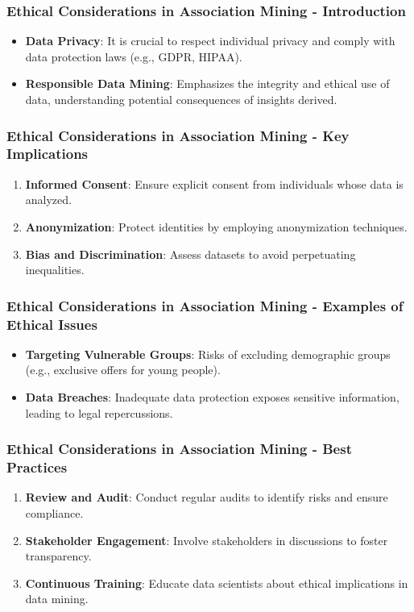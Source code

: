 \documentclass[aspectratio=169]{beamer}
\begin{document}
\begin{frame}[fragile]
    \frametitle{Ethical Considerations in Association Mining - Introduction}
    \begin{itemize}
        \item \textbf{Data Privacy}: 
        It is crucial to respect individual privacy and comply with data protection laws (e.g., GDPR, HIPAA).
        \item \textbf{Responsible Data Mining}: 
        Emphasizes the integrity and ethical use of data, understanding potential consequences of insights derived.
    \end{itemize}
\end{frame}

\begin{frame}[fragile]
    \frametitle{Ethical Considerations in Association Mining - Key Implications}
    \begin{enumerate}
        \item \textbf{Informed Consent}: 
        Ensure explicit consent from individuals whose data is analyzed.
        \item \textbf{Anonymization}: 
        Protect identities by employing anonymization techniques.
        \item \textbf{Bias and Discrimination}: 
        Assess datasets to avoid perpetuating inequalities.
    \end{enumerate}
\end{frame}

\begin{frame}[fragile]
    \frametitle{Ethical Considerations in Association Mining - Examples of Ethical Issues}
    \begin{itemize}
        \item \textbf{Targeting Vulnerable Groups}:
        Risks of excluding demographic groups (e.g., exclusive offers for young people).
        \item \textbf{Data Breaches}:
        Inadequate data protection exposes sensitive information, leading to legal repercussions.
    \end{itemize}
\end{frame}

\begin{frame}[fragile]
    \frametitle{Ethical Considerations in Association Mining - Best Practices}
    \begin{enumerate}
        \item \textbf{Review and Audit}: 
        Conduct regular audits to identify risks and ensure compliance.
        \item \textbf{Stakeholder Engagement}: 
        Involve stakeholders in discussions to foster transparency.
        \item \textbf{Continuous Training}: 
        Educate data scientists about ethical implications in data mining.
    \end{enumerate}
\end{frame}
\end{document}
